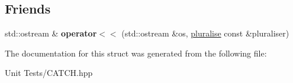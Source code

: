 \subsection*{Friends}
\begin{DoxyCompactItemize}
\item 
std\+::ostream \& {\bfseries operator$<$$<$} (std\+::ostream \&os, \hyperlink{structCatch_1_1pluralise}{pluralise} const \&pluraliser)\hypertarget{structCatch_1_1pluralise_aa7dac6b165514c1f85e0695d678fdef5}{}\label{structCatch_1_1pluralise_aa7dac6b165514c1f85e0695d678fdef5}

\end{DoxyCompactItemize}


The documentation for this struct was generated from the following file\+:\begin{DoxyCompactItemize}
\item 
Unit Tests/C\+A\+T\+C\+H.\+hpp\end{DoxyCompactItemize}
